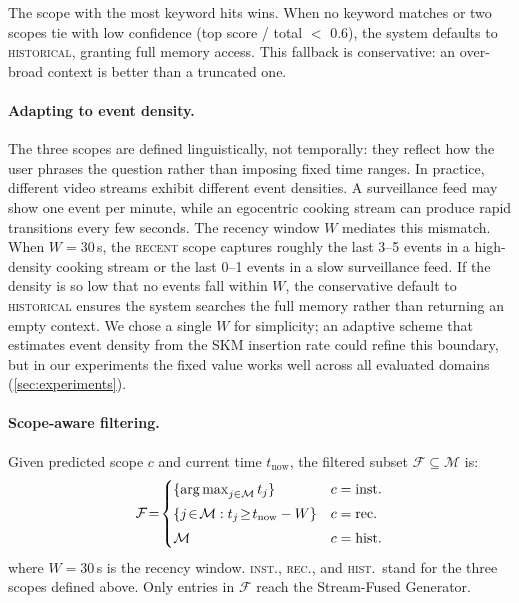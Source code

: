 The scope with the most keyword hits wins. When no keyword matches or two scopes tie with low confidence (top score / total $<$ 0.6), the system defaults to \textsc{historical}, granting full memory access. This fallback is conservative: an over-broad context is better than a truncated one.

\paragraph{Adapting to event density.}
The three scopes are defined linguistically, not temporally: they reflect how the user phrases the question rather than imposing fixed time ranges.
In practice, different video streams exhibit different event densities.
A surveillance feed may show one event per minute, while an egocentric cooking stream can produce rapid transitions every few seconds.
The recency window $W$ mediates this mismatch.
When $W = 30$\,s, the \textsc{recent} scope captures roughly the last 3--5 events in a high-density cooking stream or the last 0--1 events in a slow surveillance feed.
If the density is so low that no events fall within $W$, the conservative default to \textsc{historical} ensures the system searches the full memory rather than returning an empty context.
We chose a single $W$ for simplicity; an adaptive scheme that estimates event density from the SKM insertion rate could refine this boundary, but in our experiments the fixed value works well across all evaluated domains (\cref{sec:experiments}).

\paragraph{Scope-aware filtering.}
Given predicted scope $c$ and current time $t_{\text{now}}$, the filtered subset $\mathcal{F} \subseteq \mathcal{M}$ is:
\begin{equation}
  \mathcal{F} \!=\!
  \begin{cases}
    \{\operatorname*{arg\,max}_{j \in \mathcal{M}} t_j\}                        & c = \text{inst.} \\[3pt]
    \{j \!\in\! \mathcal{M} : t_j \!\ge\! t_{\text{now}} - W\} & c = \text{rec.}  \\[3pt]
    \mathcal{M}                                                 & c = \text{hist.}
  \end{cases}
  \label{eq:scope_filter}
\end{equation}
where $W = 30$\,s is the recency window. \textsc{inst.}, \textsc{rec.}, and \textsc{hist.}\ stand for the three scopes defined above. Only entries in $\mathcal{F}$ reach the Stream-Fused Generator.


